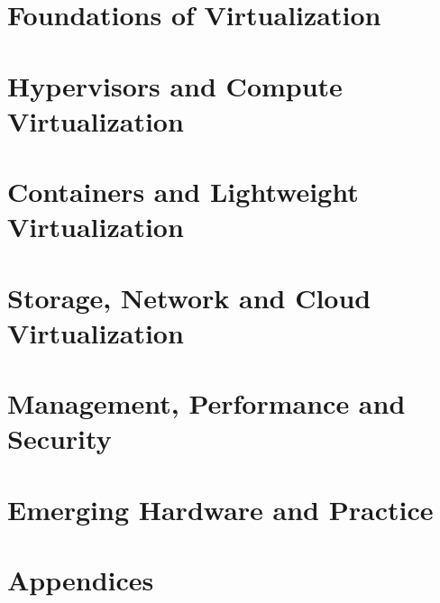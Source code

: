 \documentclass[11pt,a4paper,oneside]{report}
\begin{document}


\part{Foundations of Virtualization}





\part{Hypervisors and Compute Virtualization}






\part{Containers and Lightweight Virtualization}






\part{Storage, Network and Cloud Virtualization}






\part{Management, Performance and Security}






\part{Emerging Hardware and Practice}






\appendix
\part*{Appendices}







\end{document}
